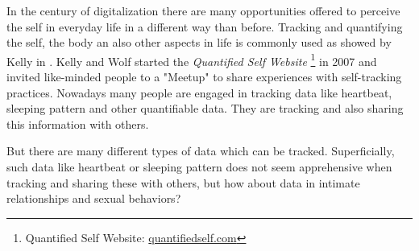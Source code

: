 \label{sec:introduction}

In the century of digitalization there are many opportunities offered to perceive the self in everyday life in a different way than before. Tracking and quantifying the self, the body an also other aspects in life is commonly used as showed by Kelly in \cite{kelly2017inevitable}. Kelly and Wolf started the \textit{Quantified Self Website} \footnote{Quantified Self Website: \url{quantifiedself.com}} in 2007 and invited like-minded people to a "Meetup" to share experiences with self-tracking practices. Nowadays many people are engaged in tracking data like heartbeat, sleeping pattern and other quantifiable data. They are tracking and also sharing this information with others. 


But there are many different types of data which can be tracked. Superficially, such data like heartbeat or sleeping pattern does not seem apprehensive when tracking and sharing these with others, but how about data in intimate relationships and sexual behaviors?


